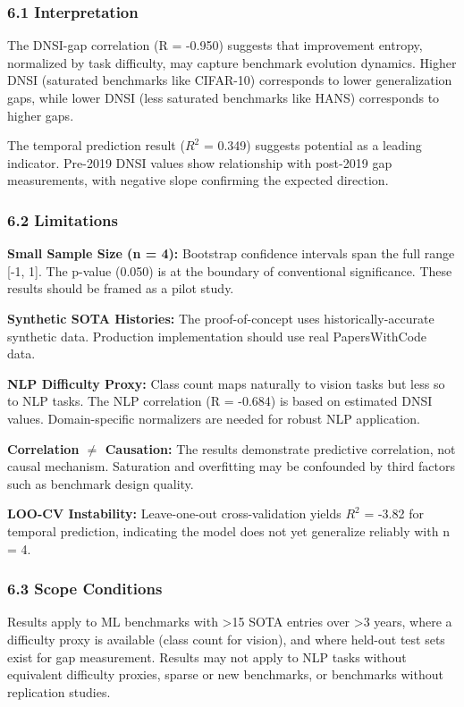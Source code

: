 
\subsubsection{6.1 Interpretation}

The DNSI-gap correlation (R = -0.950) suggests that improvement entropy, normalized by task difficulty, may capture benchmark evolution dynamics. Higher DNSI (saturated benchmarks like CIFAR-10) corresponds to lower generalization gaps, while lower DNSI (less saturated benchmarks like HANS) corresponds to higher gaps.

The temporal prediction result ($R^2$ = 0.349) suggests potential as a leading indicator. Pre-2019 DNSI values show relationship with post-2019 gap measurements, with negative slope confirming the expected direction.

\subsubsection{6.2 Limitations}

\textbf{Small Sample Size (n = 4):} Bootstrap confidence intervals span the full range [-1, 1]. The p-value (0.050) is at the boundary of conventional significance. These results should be framed as a pilot study.

\textbf{Synthetic SOTA Histories:} The proof-of-concept uses historically-accurate synthetic data. Production implementation should use real PapersWithCode data.

\textbf{NLP Difficulty Proxy:} Class count maps naturally to vision tasks but less so to NLP tasks. The NLP correlation (R = -0.684) is based on estimated DNSI values. Domain-specific normalizers are needed for robust NLP application.

\textbf{Correlation $\neq$ Causation:} The results demonstrate predictive correlation, not causal mechanism. Saturation and overfitting may be confounded by third factors such as benchmark design quality.

\textbf{LOO-CV Instability:} Leave-one-out cross-validation yields $R^2$ = -3.82 for temporal prediction, indicating the model does not yet generalize reliably with n = 4.

\subsubsection{6.3 Scope Conditions}

Results apply to ML benchmarks with >15 SOTA entries over >3 years, where a difficulty proxy is available (class count for vision), and where held-out test sets exist for gap measurement. Results may not apply to NLP tasks without equivalent difficulty proxies, sparse or new benchmarks, or benchmarks without replication studies.


